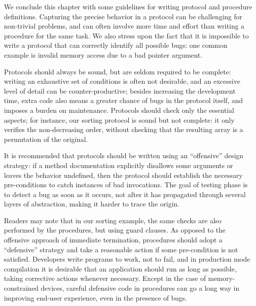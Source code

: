 We conclude this chapter with some guidelines
for writing protocol and procedure definitions.
Capturing the precise behavior in a protocol can be
challenging for non-trivial problems, and can often involve
more time and effort than writing a procedure for the same task.
We also stress upon the fact that it is impossible to write a
protocol that can correctly identify all possible bugs: one common
example is invalid memory access due to a bad pointer argument.

Protocols should always be sound, but are seldom required to be complete:
writing an exhaustive set of conditions is often not desirable,
and an excessive level of detail can be counter-productive;
besides increasing the development time, extra code also means a greater
chance of bugs in the protocol itself, and imposes a burden on maintenance.
Protocols should check only the essential aspects; for instance, our sorting
protocol is sound but not complete: it only verifies the non-decreasing order,
without checking that the resulting array is a permutation of the original.

It is recommended that protocols should be written using an ``offensive''
design strategy: if a method documentation explicitly disallows some
arguments or leaves the behavior undefined, then the protocol should
establish the necessary pre-conditions to catch instances of bad invocations.
The goal of testing phase is to detect a bug as soon as it occurs,
not after it has propagated through several layers of abstraction,
making it harder to trace the origin.

Readers may note that in our sorting example, the same checks
are also performed by the procedures, but using guard clauses.
As opposed to the offensive approach of immediate termination,
procedures should adopt a ``defensive'' strategy and take a
reasonable action if some pre-condition is not satisfied.
Developers write programs to work, not to fail, and in production
mode compilation it is desirable that an application should run
as long as possible, taking corrective actions whenever necessary.
Except in the case of memory-constrained devices,
careful defensive code in procedures can go a long way in
improving end-user experience, even in the presence of bugs.

\enlargethispage*{\baselineskip}
\pagebreak
